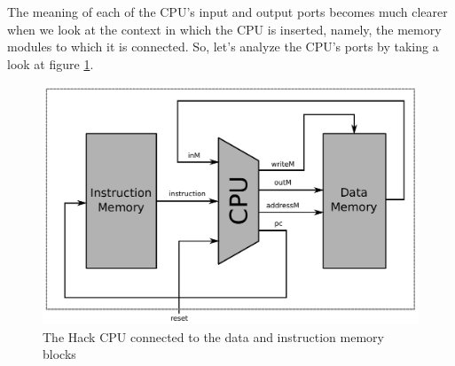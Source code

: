 \documentclass[a4paper]{article}
\begin{document}
            The meaning of each of the CPU's input and output ports becomes much clearer when we
            look at the context in which the CPU is inserted, namely, the memory modules to which it
            is connected. So, let's analyze the CPU's ports by taking a look at figure
            \ref{fig:cpu-memory}.
            \begin{figure}[h]
                \begin{center}
                    \includegraphics[width=1.0\textwidth]{imgs/cpu-memory.pdf}
                \end{center}
                \label{fig:cpu-memory}
                \caption{The Hack CPU connected to the data and instruction memory blocks}
            \end{figure}


    
    

\end{document}
